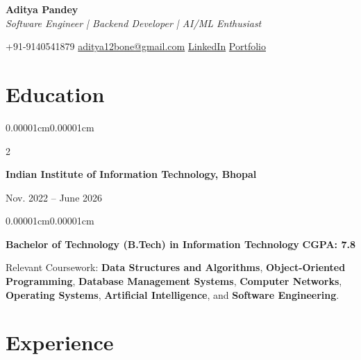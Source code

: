 \documentclass[10pt,letterpaper]{article}
\newenvironment{onecolentry}{
    \begin{adjustwidth}{0.00001cm}{0.00001cm}
}{
    \end{adjustwidth}
}
\newenvironment{twocolentry}[1]{
    \onecolentry
    \def\secondColumn{#1}
    \setcolumnwidth{\fill,4.5cm}
    \begin{paracol}{2}
}{
    \switchcolumn
    \raggedleft
    \secondColumn
    \end{paracol}
    \endonecolentry
}
\begin{document}
\begin{center}
    {\fontsize{25pt}{25pt}\selectfont\textbf{Aditya Pandey}}\\[3pt]
    \textit{Software Engineer \;|\; Backend Developer \;|\; AI/ML Enthusiast}

    \vspace{5pt}

    {\small
        +91-9140541879 \quad
        \href{mailto:aditya12bone@gmail.com}{aditya12bone@gmail.com} \quad
        \href{https://www.linkedin.com/in/aditya-p01/}{LinkedIn} \quad
        \href{https://aditya-portfolio-pi-nine.vercel.app/}{Portfolio}
    }
\end{center}

\vspace{-11pt}

\section{Education}

\begin{twocolentry}{Nov. 2022 -- June 2026}
    \textbf{Indian Institute of Information Technology, Bhopal}
\end{twocolentry}
\begin{onecolentry}
    \textbf{Bachelor of Technology (B.Tech) in Information Technology}
    \hfill \textbf{CGPA: 7.8}

    \vspace{1pt}
    Relevant Coursework: \textbf{Data Structures and Algorithms},
    \textbf{Object-Oriented Programming}, \textbf{Database Management Systems},
    \textbf{Computer Networks}, \textbf{Operating Systems},
    \textbf{Artificial Intelligence}, and \textbf{Software Engineering}.
\end{onecolentry}

\section{Experience}
\end{document}
